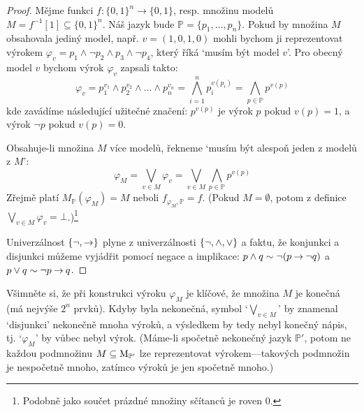 \begin{proof}
Mějme funkci $f\colon \{0,1\}^n\to \{0,1\}$, resp. množinu modelů $M=f^{-1}[1]\subseteq \{0,1\}^n$. Náš jazyk bude $\mathbb P=\{p_1,\dots,p_n\}$. Pokud by množina $M$ obsahovala jediný model, např. $v=(1,0,1,0)$ mohli bychom ji reprezentovat výrokem $\varphi_v=p_1\land \neg p_2 \land p_3\land \neg p_4$, který říká `musím být model $v$'. Pro obecný model $v$ bychom výrok $\varphi_v$ zapsali takto:
$$
\varphi_v = p_1^{v_1}\land p_2^{v_2}\land \dots\land p_n^{v_n}=\bigwedge_{i=1}^n p_i^{v(p_i)}=\bigwedge_{p\in\mathbb P}p^{v(p)}
$$
kde zavádíme následující užitečné značení: $p^{v(p)}$ je výrok $p$ pokud $v(p)=1$, a výrok $\neg p$ pokud $v(p)=0$.

Obsahuje-li množina $M$ více modelů, řekneme `musím být alespoň jeden z modelů z $M$':
\
$$
\varphi_M = \bigvee_{v\in M}\varphi_v=\bigvee_{v\in M}\bigwedge_{p\in\mathbb P}p^{v(p)}
$$
Zřejmě platí $M_\mathbb P(\varphi_M)=M$ neboli $f_{\varphi_M,\mathbb P}=f$. (Pokud $M=\emptyset$, potom z definice $\bigvee_{v\in M}\varphi_v=\bot$.)\footnote{Podobně jako součet prázdné množiny sčítanců je roven 0.}

Univerzálnost $\{\neg, {\mathbin{\rightarrow}}\}$ plyne z univerzálnosti $\{\neg, {\land},{\lor}\}$ a faktu, že konjunkci a disjunkci můžeme vyjádřit pomocí negace a implikace: $p\land q\sim \neg (p\mathbin{\rightarrow} \neg q)$ a $p\lor q\sim \neg p\mathbin{\rightarrow} q$.
\end{proof}

\begin{remark}
Všimněte si, že při konstrukci výroku $\varphi_M$ je klíčové, že množina $M$ je konečná (má nejvýše $2^n$ prvků). Kdyby byla nekonečná, symbol `$\bigvee_{v\in M}$' by znamenal `disjunkci' nekonečně mnoha výroků, a výsledkem by tedy nebyl konečný nápis, tj. `$\varphi_M$' by vůbec nebyl výrok. (Máme-li spočetně nekonečný jazyk $\mathbb P'$, potom ne každou podmnožinu $M\subseteq \operatorname{M}_{\mathbb P'}$ lze reprezentovat výrokem---takových podmnožin je nespočetně mnoho, zatímco výroků je jen spočetně mnoho.)
\end{remark}

